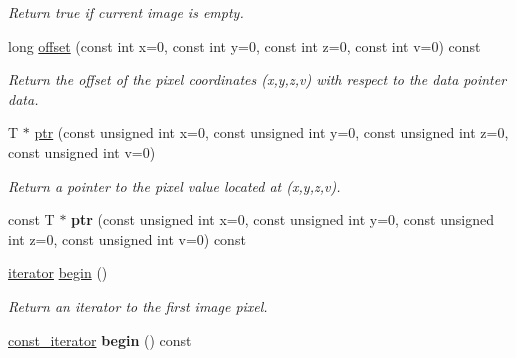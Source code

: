 \begin{DoxyCompactItemize}
\begin{DoxyCompactList}\small\item\em Return {\ttfamily true} if current image is empty. \item\end{DoxyCompactList}\item 
long \hyperlink{structcimg__library_1_1_c_img_a266ad9e6e5d13058af75966b7d7e3ad9}{offset} (const int x=0, const int y=0, const int z=0, const int v=0) const 
\begin{DoxyCompactList}\small\item\em Return the offset of the pixel coordinates ({\ttfamily x},{\ttfamily y},{\ttfamily z},{\ttfamily v}) with respect to the data pointer {\ttfamily data}. \item\end{DoxyCompactList}\item 
T $\ast$ \hyperlink{structcimg__library_1_1_c_img_af19c37d44b9fce37ad7c4a9ad247d1a0}{ptr} (const unsigned int x=0, const unsigned int y=0, const unsigned int z=0, const unsigned int v=0)
\begin{DoxyCompactList}\small\item\em Return a pointer to the pixel value located at ({\ttfamily x},{\ttfamily y},{\ttfamily z},{\ttfamily v}). \item\end{DoxyCompactList}\item 
\hypertarget{structcimg__library_1_1_c_img_acd0775163aa95d0b4317f98063167c9f}{
const T $\ast$ {\bfseries ptr} (const unsigned int x=0, const unsigned int y=0, const unsigned int z=0, const unsigned int v=0) const }
\label{structcimg__library_1_1_c_img_acd0775163aa95d0b4317f98063167c9f}

\item 
\hypertarget{structcimg__library_1_1_c_img_a949050ed420affec534b8aca29021846}{
\hyperlink{structcimg__library_1_1_c_img_a3ff3f07802e67c4ba930427ea45655c8}{iterator} \hyperlink{structcimg__library_1_1_c_img_a949050ed420affec534b8aca29021846}{begin} ()}
\label{structcimg__library_1_1_c_img_a949050ed420affec534b8aca29021846}

\begin{DoxyCompactList}\small\item\em Return an iterator to the first image pixel. \item\end{DoxyCompactList}\item 
\hypertarget{structcimg__library_1_1_c_img_a726390b02650851b9195cdef48248fad}{
\hyperlink{structcimg__library_1_1_c_img_ad444f21017aaa7da6fab45930d3579aa}{const\_\-iterator} {\bfseries begin} () const }
\label{structcimg__library_1_1_c_img_a726390b02650851b9195cdef48248fad}


\end{DoxyCompactItemize}
